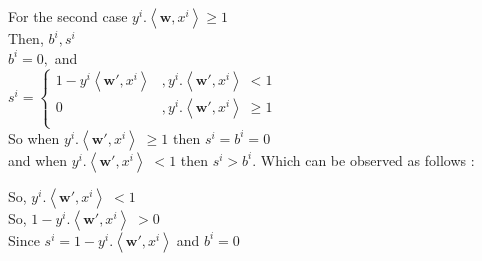\documentclass[a4paper,11pt]{article}
\begin{document}
\begin{mlsolution}
For the second case \begin{math}
y^{i}.\left \langle \textbf{w}, x^{i} \right \rangle \geq 1
\end{math}\\

Then, \begin{math}b^{i}, s^{i}\end{math}\\

\begin{math}
b^{i} = 0 ,
\end{math} and\\

\begin{math}
s^{i} = \left\{\begin{matrix}
1 - y^{i}\left \langle \textbf{w}{}', x^{i}\right \rangle & ,y^{i}.\left \langle \textbf{w}{}', x^{i} \right \rangle \; <  1\\ 
0 & ,y^{i}.\left \langle \textbf{w}{}', x^{i}\right \rangle \; \geq  1\\ \end{matrix}\right.
\end{math}\\ 

So when \begin{math}y^{i}.\left \langle \textbf{w}{}', x^{i} \right \rangle \; \geq  1\end{math} then \; \begin{math} s^{i} = b^{i} = 0 \end{math} \\

and when \begin{math}y^{i}.\left \langle \textbf{w}{}', x^{i} \right \rangle \; <  1\end{math}
then \; \begin{math} s^{i} > b^{i}\end{math}. Which can be observed as follows :
 
So, \begin{math}y^{i}.\left \langle \textbf{w}{}', x^{i} \right \rangle \; <  1 \end{math} \\

So, \begin{math} 1- y^{i}.\left \langle \textbf{w}{}', x^{i} \right \rangle \; >  0 \end{math} \\

Since \begin{math} s^{i} = 1- y^{i}.\left \langle \textbf{w}{}', x^{i} \right \rangle \; \end{math}and \begin{math} b^{i} = 0 \end{math} \\


\end{mlsolution}
\end{document}
